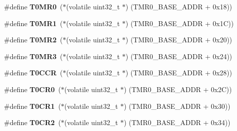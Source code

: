 \begin{DoxyCompactItemize}
\item 
\mbox{\label{group__lpc24xx__regs_ga8bee2a36f8e241b9db3c9c7f87143a99}} 
\#define {\bfseries T0\+M\+R0}~($\ast$(volatile uint32\+\_\+t $\ast$) (T\+M\+R0\+\_\+\+B\+A\+S\+E\+\_\+\+A\+D\+DR + 0x18))
\item 
\mbox{\label{group__lpc24xx__regs_gafcda6dd57c1f5114f0574f9a8c668636}} 
\#define {\bfseries T0\+M\+R1}~($\ast$(volatile uint32\+\_\+t $\ast$) (T\+M\+R0\+\_\+\+B\+A\+S\+E\+\_\+\+A\+D\+DR + 0x1\+C))
\item 
\mbox{\label{group__lpc24xx__regs_gaf37e7fe881f158029616b5fe699dcd0b}} 
\#define {\bfseries T0\+M\+R2}~($\ast$(volatile uint32\+\_\+t $\ast$) (T\+M\+R0\+\_\+\+B\+A\+S\+E\+\_\+\+A\+D\+DR + 0x20))
\item 
\mbox{\label{group__lpc24xx__regs_ga91b36df698ef061e7a6a21226a4903f4}} 
\#define {\bfseries T0\+M\+R3}~($\ast$(volatile uint32\+\_\+t $\ast$) (T\+M\+R0\+\_\+\+B\+A\+S\+E\+\_\+\+A\+D\+DR + 0x24))
\item 
\mbox{\label{group__lpc24xx__regs_ga5a2498c5217384197c415a4f860d7b7d}} 
\#define {\bfseries T0\+C\+CR}~($\ast$(volatile uint32\+\_\+t $\ast$) (T\+M\+R0\+\_\+\+B\+A\+S\+E\+\_\+\+A\+D\+DR + 0x28))
\item 
\mbox{\label{group__lpc24xx__regs_ga30e040cd93a01687d0444ebe8528cc96}} 
\#define {\bfseries T0\+C\+R0}~($\ast$(volatile uint32\+\_\+t $\ast$) (T\+M\+R0\+\_\+\+B\+A\+S\+E\+\_\+\+A\+D\+DR + 0x2\+C))
\item 
\mbox{\label{group__lpc24xx__regs_ga2b8c430359234e8f74d0ff7270a73d31}} 
\#define {\bfseries T0\+C\+R1}~($\ast$(volatile uint32\+\_\+t $\ast$) (T\+M\+R0\+\_\+\+B\+A\+S\+E\+\_\+\+A\+D\+DR + 0x30))
\item 
\mbox{\label{group__lpc24xx__regs_gaa76826c11cd21e377f06125859f81e24}} 
\#define {\bfseries T0\+C\+R2}~($\ast$(volatile uint32\+\_\+t $\ast$) (T\+M\+R0\+\_\+\+B\+A\+S\+E\+\_\+\+A\+D\+DR + 0x34))
\item 
\mbox{\label{group__lpc24xx__regs_gaeb9360d2d372c19653020c3b2bfc0cc0}} 

\end{DoxyCompactItemize}

